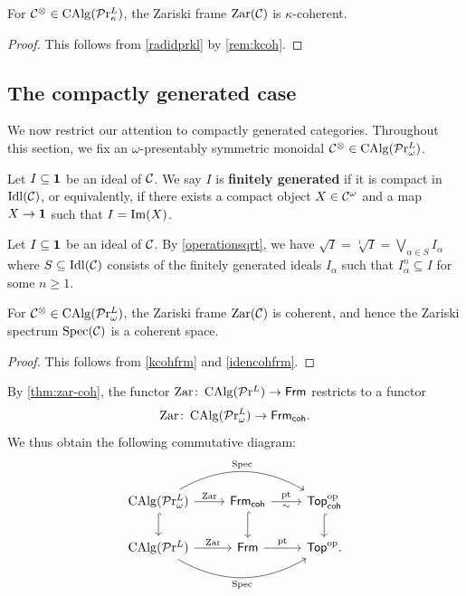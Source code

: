 \documentclass[10pt,a4paper,oneside]{article}
\begin{document}
\begin{cor}\label{kcohfrm}
For $\mathcal{C}^\otimes\in\operatorname{CAlg}(\mathcal{P}\mathrm{r}^L_\kappa)$, the Zariski frame $\operatorname{Zar}(\mathcal C)$ is $\kappa$-coherent.
\end{cor}
\begin{proof}
This follows from \cref{radidprkl} by \cref{rem:kcoh}.
\end{proof}

\subsection{The compactly generated case}\label{sec2.3}
We now restrict our attention to compactly generated categories. Throughout this section, we fix an $\omega$-presentably symmetric monoidal \infcat $\mathcal{C}^\otimes\in\operatorname{CAlg}(\mathcal{P}\mathrm{r}^L_{\omega})$.

\begin{de}\label{def:fg-ideal}
Let $I\subseteq\mathbf{1}$ be an ideal of $\mathcal{C}$. We say $I$ is \textbf{finitely generated} if it is compact in $\operatorname{Idl}(\mathcal{C})$, or equivalently, if there exists a compact object $X\in\mathcal{C}^\omega$ and a map $X\to \mathbf{1}$ such that $I=\operatorname{Im}(X)$.
\end{de}

\begin{rem}
Let $I\subseteq\mathbf{1}$ be an ideal of $\mathcal{C}$. By \cref{operationsqrt}, we have $\sqrt{I}=\sqrt[1]{I}= \bigvee_{\alpha\in S}I_\alpha$ where $S\subseteq \operatorname{Idl}(\mathcal{C})$ consists of the finitely generated ideals $I_\alpha$ such that $I^n_\alpha\subseteq I$ for some $n\geq 1$.
\end{rem}

\begin{thm}\label{thm:zar-coh}
For $\mathcal{C}^\otimes\in\operatorname{CAlg}(\mathcal{P}\mathrm{r}^L_{\omega})$, the Zariski frame $\operatorname{Zar}(\mathcal{C})$ is coherent, and hence the Zariski spectrum $\operatorname{Spec}(\mathcal{C})$ is a coherent space.
\end{thm}
\begin{proof}
This follows from \cref{kcohfrm} and \eqref{idencohfrm}.
\end{proof}

\begin{rem}
By \cref{thm:zar-coh}, the functor $\operatorname{Zar}\colon \operatorname{CAlg}(\mathcal{P}\mathrm{r}^L)\to \mathsf{Frm}$ restricts to a functor $$\operatorname{Zar}\colon \operatorname{CAlg}(\mathcal{P}\mathrm{r}^L_\omega) \to \mathsf{Frm}_{\mathsf{coh}}.$$
We thus obtain the following commutative diagram:
\[
\begin{tikzcd}
\calg(\prl_\omega) \arrow[d, hook] \arrow[r, "\op{Zar}"] \arrow[rr, "\spec", bend left] & \frmcoh \arrow[d, hook] \arrow[r, "\op{pt}", "\sim"'] & \topcoh \arrow[d, hook] \\
\calg(\prl) \arrow[r, "\op{Zar}"] \arrow[rr, "\spec"', bend right]                      & \frm \arrow[r, "\op{pt}"]                  & \Top.             
\end{tikzcd}
\]
\end{rem}
\end{document}

